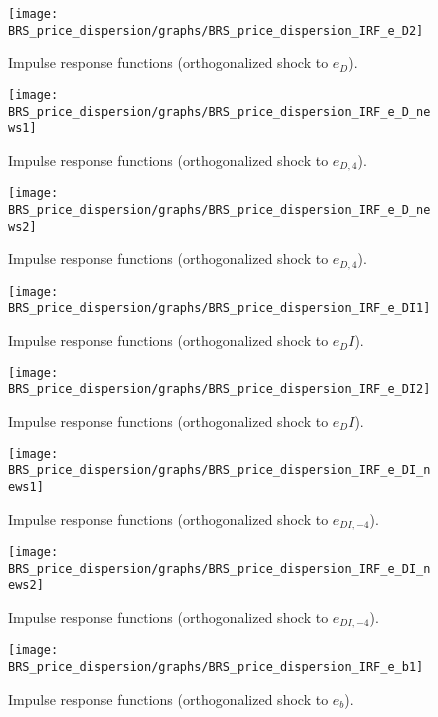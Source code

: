 \begin{figure}[H]
\centering 
\texttt{[image: BRS\_price\_dispersion/graphs/BRS\_price\_dispersion\_IRF\_e\_D2]}
\caption{Impulse response functions (orthogonalized shock to ${e_D}$).}\label{Fig:IRF:e_D:2}
\end{figure}
 
\begin{figure}[H]
\centering 
\texttt{[image: BRS\_price\_dispersion/graphs/BRS\_price\_dispersion\_IRF\_e\_D\_news1]}
\caption{Impulse response functions (orthogonalized shock to ${e_{D,4}}$).}\label{Fig:IRF:e_D_news:1}
\end{figure}
 
\begin{figure}[H]
\centering 
\texttt{[image: BRS\_price\_dispersion/graphs/BRS\_price\_dispersion\_IRF\_e\_D\_news2]}
\caption{Impulse response functions (orthogonalized shock to ${e_{D,4}}$).}\label{Fig:IRF:e_D_news:2}
\end{figure}
 
\begin{figure}[H]
\centering 
\texttt{[image: BRS\_price\_dispersion/graphs/BRS\_price\_dispersion\_IRF\_e\_DI1]}
\caption{Impulse response functions (orthogonalized shock to ${e_DI}$).}\label{Fig:IRF:e_DI:1}
\end{figure}
 
\begin{figure}[H]
\centering 
\texttt{[image: BRS\_price\_dispersion/graphs/BRS\_price\_dispersion\_IRF\_e\_DI2]}
\caption{Impulse response functions (orthogonalized shock to ${e_DI}$).}\label{Fig:IRF:e_DI:2}
\end{figure}
 
\begin{figure}[H]
\centering 
\texttt{[image: BRS\_price\_dispersion/graphs/BRS\_price\_dispersion\_IRF\_e\_DI\_news1]}
\caption{Impulse response functions (orthogonalized shock to ${e_{DI,-4}}$).}\label{Fig:IRF:e_DI_news:1}
\end{figure}
 
\begin{figure}[H]
\centering 
\texttt{[image: BRS\_price\_dispersion/graphs/BRS\_price\_dispersion\_IRF\_e\_DI\_news2]}
\caption{Impulse response functions (orthogonalized shock to ${e_{DI,-4}}$).}\label{Fig:IRF:e_DI_news:2}
\end{figure}
 
\begin{figure}[H]
\centering 
\texttt{[image: BRS\_price\_dispersion/graphs/BRS\_price\_dispersion\_IRF\_e\_b1]}
\caption{Impulse response functions (orthogonalized shock to ${e_b}$).}\label{Fig:IRF:e_b:1}
\end{figure}
 

